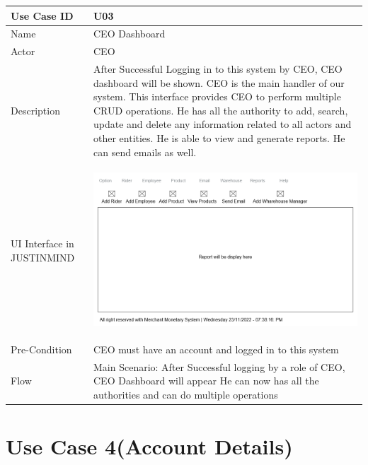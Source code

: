 \documentclass[12pt,a4paper]{report}
\begin{document}
\begin{tabular}{ | m{3cm} | m{12cm}| } \hline

Use Case ID & U03  \\\hline

Name  	    & CEO Dashboard  \\ \hline

Actor     	& CEO \\ \hline

Description & After Successful Logging in to this system by CEO, CEO dashboard will be shown. CEO is the main handler of our system. This interface provides CEO to perform multiple CRUD operations. He has all the authority to add, search, update and delete any information related to all actors and other entities. He is able to view and generate reports. He can send emails as well. \\ \hline

UI Interface in JUSTINMIND & \begin{center} \includegraphics[scale=0.3]{./UIs for Latex Reports/UI-007 CEO Dashboard@1x.png}\end{center}  \\ \hline

Pre-Condition &  CEO must have an account and logged in to this system \\ \hline

Flow & Main Scenario:
After Successful logging by a role of CEO, CEO Dashboard will appear
He can now has all the authorities and can do multiple operations
\\ \hline
\end{tabular}
\section{Use Case 4(Account Details) }
\end{document}
